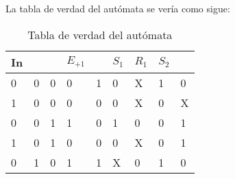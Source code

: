 \documentclass{article}
\begin{document}
 		La tabla de verdad del autómata se vería como sigue:
    	\begin{table}[H]
    		\caption{Tabla de verdad del autómata}
    		\begin{center}
    		\begin{tabular}{|l|ll|ll|l|l|l|l|}
    			\hline
    			\cellcolor[HTML]{FFCCC9}In & \cellcolor[HTML]{FFFFC7}{\color[HTML]{000000} E} & \cellcolor[HTML]{FFFFC7}{\color[HTML]{000000} } & \cellcolor[HTML]{FFCC67}$E_{+1}$ & \cellcolor[HTML]{FFCC67} & \cellcolor[HTML]{38FFF8}$S_{1}$ & \cellcolor[HTML]{96FFFB}$R_{1}$ & \cellcolor[HTML]{B979FF}$S_{2}$ & \cellcolor[HTML]{D7B1FF}{\color[HTML]{000000} $R_{2}$} \\ \hline
    			0                          & \multicolumn{1}{l|}{0}                           & 0                                               & \multicolumn{1}{l|}{0}           & 1                        & 0                               & X                               & 1                               & 0                                                      \\ \hline
    			1                          & \multicolumn{1}{l|}{0}                           & 0                                               & \multicolumn{1}{l|}{0}           & 0                        & 0                               & X                               & 0                               & X                                                      \\ \hline
    			0                          & \multicolumn{1}{l|}{0}                           & 1                                               & \multicolumn{1}{l|}{1}           & 0                        & 1                               & 0                               & 0                               & 1                                                      \\ \hline
    			1                          & \multicolumn{1}{l|}{0}                           & 1                                               & \multicolumn{1}{l|}{0}           & 0                        & 0                               & X                               & 0                               & 1                                                      \\ \hline
    			0                          & \multicolumn{1}{l|}{1}                           & 0                                               & \multicolumn{1}{l|}{1}           & 1                        & X                               & 0                               & 1                               & 0                                                      \\ \hline

\end{tabular}
\end{center}
\end{table}
\end{document}
